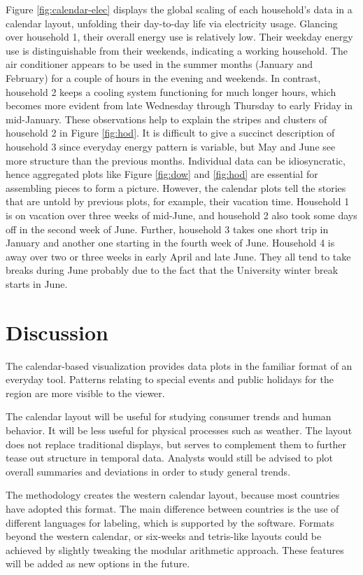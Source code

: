 \documentclass[12pt]{article}
\begin{document}
Figure \ref{fig:calendar-elec} displays the global scaling of each household's data in a calendar layout, unfolding their day-to-day life via electricity usage. Glancing over household 1, their overall energy use is relatively low. Their weekday energy use is distinguishable from their weekends, indicating a working household. The air conditioner appears to be used in the summer months (January and February) for a couple of hours in the evening and weekends. In contrast, household 2 keeps a cooling system functioning for much longer hours, which becomes more evident from late Wednesday through Thursday to early Friday in mid-January. These observations help to explain the stripes and clusters of household 2 in Figure \ref{fig:hod}. It is difficult to give a succinct description of household 3 since everyday energy pattern is variable, but May and June see more structure than the previous months. Individual data can be idiosyncratic, hence aggregated plots like Figure \ref{fig:dow} and \ref{fig:hod} are essential for assembling pieces to form a picture. However, the calendar plots tell the stories that are untold by previous plots, for example, their vacation time. Household 1 is on vacation over three weeks of mid-June, and household 2 also took some days off in the second week of June. Further, household 3 takes one short trip in January and another one starting in the fourth week of June. Household 4 is away over two or three weeks in early April and late June. They all tend to take breaks during June probably due to the fact that the University winter break starts in June.

\hypertarget{sec:discussion}{%
\section{Discussion}\label{sec:discussion}}

The calendar-based visualization provides data plots in the familiar format of an everyday tool. Patterns relating to special events and public holidays for the region are more visible to the viewer.

The calendar layout will be useful for studying consumer trends and human behavior. It will be less useful for physical processes such as weather. The layout does not replace traditional displays, but serves to complement them to further tease out structure in temporal data. Analysts would still be advised to plot overall summaries and deviations in order to study general trends.

The methodology creates the western calendar layout, because most countries have adopted this format. The main difference between countries is the use of different languages for labeling, which is supported by the software. Formats beyond the western calendar, or six-weeks and tetris-like layouts could be achieved by slightly tweaking the modular arithmetic approach. These features will be added as new options in the future.
\end{document}
